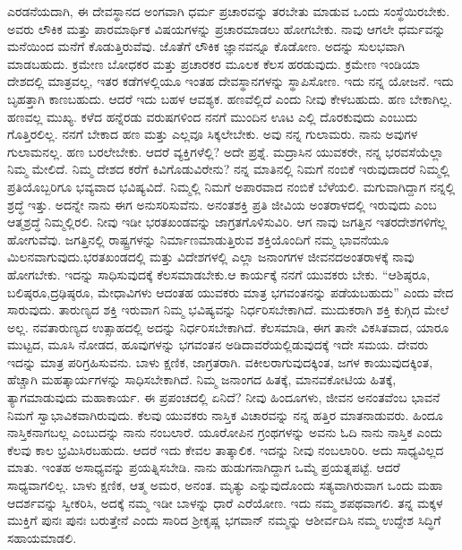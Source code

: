 \vskip -1pt

ಎರಡನೆಯದಾಗಿ, ಈ ದೇವಸ್ಥಾನದ ಅಂಗವಾಗಿ ಧರ್ಮ ಪ್ರಚಾರವನ್ನು ತರಬೇತು ಮಾಡುವ ಒಂದು ಸಂಸ್ಥೆಯಿರಬೇಕು. ಅವರು ಲೌಕಿಕ ಮತ್ತು ಪಾರಮಾರ್ಥಿಕ ವಿಷಯಗಳನ್ನು ಪ್ರಚಾರಮಾಡಲು ಹೋಗಬೇಕು. ನಾವು ಆಗಲೇ ಧರ್ಮವನ್ನು ಮನೆಯಿಂದ ಮನೆಗೆ ಕೊಡುತ್ತಿರುವೆವು. ಜೊತೆಗೆ ಲೌಕಿಕ ಜ್ಞಾನವನ್ನೂ ಕೊಡೋಣ. ಅದನ್ನು ಸುಲಭವಾಗಿ ಮಾಡಬಹುದು. ಕ್ರಮೇಣ ಬೋಧಕರ ಮತ್ತು ಪ್ರಚಾರಕರ ಮೂಲಕ ಕೆಲಸ ಹರಡುವುದು. ಕ್ರಮೇಣ ಇಂಡಿಯಾ ದೇಶದಲ್ಲಿ ಮಾತ್ರವಲ್ಲ, ಇತರ ಕಡೆಗಳಲ್ಲಿಯೂ ಇಂತಹ ದೇವಸ್ಥಾನಗಳನ್ನು ಸ್ಥಾಪಿಸೋಣ. ಇದು ನನ್ನ ಯೋಜನೆ. ಇದು ಬೃಹತ್ತಾಗಿ ಕಾಣಬಹುದು. ಆದರೆ ಇದು ಬಹಳ ಆವಶ್ಯಕ. ಹಣವೆಲ್ಲಿದೆ ಎಂದು ನೀವು ಕೇಳಬಹುದು. ಹಣ ಬೇಕಾಗಿಲ್ಲ. ಹಣವಲ್ಲ ಮುಖ್ಯ. ಕಳೆದ ಹನ್ನೆರಡು ವರುಷ\-ಗಳಿಂದ ನನಗೆ ಮುಂದಿನ ಊಟ ಎಲ್ಲಿ ದೊರಕುವುದು ಎಂಬುದು ಗೊತ್ತಿರಲಿಲ್ಲ. ನನಗೆ ಬೇಕಾದ ಹಣ ಮತ್ತು ಎಲ್ಲವೂ ಸಿಕ್ಕಲೇಬೇಕು. ಅವು ನನ್ನ ಗುಲಾಮರು. ನಾನು ಅವುಗಳ ಗುಲಾಮನಲ್ಲ. ಹಣ ಬರಲೇಬೇಕು. ಆದರೆ ವ್ಯಕ್ತಿಗಳೆಲ್ಲಿ? ಅದೇ ಪ್ರಶ್ನೆ. ಮದ್ರಾಸಿನ ಯುವಕರೇ, ನನ್ನ ಭರವಸೆಯೆಲ್ಲಾ ನಿಮ್ಮ ಮೇಲಿದೆ. ನಿಮ್ಮ ದೇಶದ ಕರೆಗೆ ಕಿವಿಗೊಡುವಿರೇನು? ನನ್ನ ಮಾತಿನಲ್ಲಿ ನಿಮಗೆ ನಂಬಿಕೆ ಇರುವುದಾದರೆ ನಿಮ್ಮಲ್ಲಿ ಪ್ರತಿಯೊಬ್ಬರಿಗೂ ಭವ್ಯವಾದ ಭವಿಷ್ಯವಿದೆ. ನಿಮ್ಮಲ್ಲಿ ನಿಮಗೆ ಅಪಾರವಾದ ನಂಬಿಕೆ ಬೆಳೆಯಲಿ. ಮಗುವಾಗಿದ್ದಾಗ ನನ್ನಲ್ಲಿ ಶ್ರದ್ಧೆ ಇತ್ತು. ಅದನ್ನೇ ನಾನು ಈಗ ಅನುಸರಿಸುವೆನು. ಅನಂತಶಕ್ತಿ ಪ್ರತಿ ಜೀವಿಯ ಅಂತರಾಳದಲ್ಲಿ ಇರುವುದು ಎಂಬ ಆತ್ಮಶ್ರದ್ಧೆ ನಿಮ್ಮಲ್ಲಿರಲಿ. ನೀವು ಇಡೀ ಭರತಖಂಡವನ್ನು ಜಾಗ್ರತಗೊಳಿಸುವಿರಿ. ಆಗ ನಾವು ಜಗತ್ತಿನ ಇತರ\break ದೇಶಗಳಿಗೆಲ್ಲ ಹೋಗುವೆವು. ಜಗತ್ತಿನಲ್ಲಿ ರಾಷ್ಟ್ರಗಳನ್ನು ನಿರ್ಮಾಣ\break ಮಾಡುತ್ತಿರುವ ಶಕ್ತಿಯೊಂದಿಗೆ ನಮ್ಮ ಭಾವನೆಯೂ ಮಿಲನವಾಗುವುದು.\break ಭರತಖಂಡದಲ್ಲಿ ಮತ್ತು ವಿದೇಶಗಳಲ್ಲಿ ಎಲ್ಲಾ ಜನಾಂಗಗಳ ಜೀವನದ\break ಅಂತರಾಳಕ್ಕೆ ನಾವು ಹೋಗಬೇಕು. ಇದನ್ನು ಸಾಧಿಸುವುದಕ್ಕೆ ಕೆಲಸಮಾಡಬೇಕು.\break ಆ ಕಾರ್ಯಕ್ಕೆ ನನಗೆ ಯುವಕರು ಬೇಕು. “ಆಶಿಷ್ಠರೂ, ಬಲಿಷ್ಠರೂ,\break ದ್ರಢಿಷ್ಠರೂ, ಮೇಧಾವಿಗಳು ಆದಂತಹ ಯುವಕರು ಮಾತ್ರ ಭಗವಂತನನ್ನು ಪಡೆಯಬಹುದು” ಎಂದು ವೇದ ಸಾರುವುದು. ತಾರುಣ್ಯದ ಶಕ್ತಿ ಇರುವಾಗ ನಿಮ್ಮ ಭವಿಷ್ಯವನ್ನು ನಿರ್ಧರಿಸಬೇಕಾಗಿದೆ. ಮುದುಕರಾಗಿ ಶಕ್ತಿ ಕುಗ್ಗಿದ ಮೇಲೆ ಅಲ್ಲ. ನವತಾರುಣ್ಯದ ಉತ್ಸಾಹದಲ್ಲಿ ಅದನ್ನು ನಿರ್ಧರಿಸಬೇಕಾಗಿದೆ. ಕೆಲಸಮಾಡಿ, ಈಗ ತಾನೇ ವಿಕಸಿತವಾದ, ಯಾರೂ ಮುಟ್ಟದ, ಮೂಸಿ ನೋಡದ, ಹೂವುಗಳನ್ನು ಭಗವಂತನ ಅಡಿದಾವರೆಯಲ್ಲಿಡುವುದಕ್ಕೆ ಇದೇ ಸಮಯ. ದೇವರು ಇದನ್ನು ಮಾತ್ರ ಪರಿಗ್ರಹಿಸುವನು. ಬಾಳು ಕ್ಷಣಿಕ, ಜಾಗ್ರತರಾಗಿ. ವಕೀಲರಾಗುವುದಕ್ಕಿಂತ, ಜಗಳ ಕಾಯುವುದಕ್ಕಿಂತ, ಹೆಚ್ಚಾಗಿ ಮಹತ್ಕಾರ್ಯಗಳನ್ನು ಸಾಧಿಸಬೇಕಾಗಿದೆ. ನಿಮ್ಮ ಜನಾಂಗದ ಹಿತಕ್ಕೆ, ಮಾನವಕೋಟಿಯ ಹಿತಕ್ಕೆ, ತ್ಯಾಗಮಾಡುವುದು ಮಹಾಕಾರ್ಯ. ಈ ಪ್ರಪಂಚದಲ್ಲಿ ಏನಿದೆ? ನೀವು ಹಿಂದೂಗಳು, ಜೀವನ ಅನಂತವೆಂಬ ಭಾವನೆ ನಿಮಗೆ ಸ್ವಾಭಾವಿಕವಾಗಿರುವುದು. ಕೆಲವು ಯುವಕರು ನಾಸ್ತಿಕ ವಿಚಾರವನ್ನು ನನ್ನ ಹತ್ತಿರ ಮಾತನಾಡುವರು. ಹಿಂದೂ ನಾಸ್ತಿಕನಾಗಬಲ್ಲ ಎಂಬುದನ್ನು ನಾನು ನಂಬಲಾರೆ. ಯೂರೋಪಿನ ಗ್ರಂಥಗಳನ್ನು ಅವನು ಓದಿ ನಾನು ನಾಸ್ತಿಕ ಎಂದು ಕೆಲವು ಕಾಲ ಭ್ರಮಿಸಿರಬಹುದು. ಆದರೆ ಇದು ಕೇವಲ ತಾತ್ಕಾಲಿಕ. ಇದನ್ನು ನೀವು ನಂಬಲಾರಿರಿ. ಅದು ಸಾಧ್ಯವಿಲ್ಲದ ಮಾತು. ಇಂತಹ ಅಸಾಧ್ಯವನ್ನು ಪ್ರಯತ್ನಿಸಬೇಡಿ. ನಾನು ಹುಡುಗನಾಗಿದ್ದಾಗ ಒಮ್ಮೆ ಪ್ರಯತ್ನಪಟ್ಟೆ. ಆದರೆ ಸಾಧ್ಯವಾಗಲಿಲ್ಲ. ಬಾಳು ಕ್ಷಣಿಕ, ಆತ್ಮ ಅಮರ, ಅನಂತ. ಮೃತ್ಯು ಎನ್ನುವುದೊಂದು ಸತ್ಯವಾಗಿರುವಾಗ ಒಂದು ಮಹಾ ಆದರ್ಶವನ್ನು ಸ್ವೀಕರಿಸಿ, ಅದಕ್ಕೆ ನಮ್ಮ ಇಡೀ ಬಾಳನ್ನು ಧಾರೆ ಎರೆಯೋಣ. ಇದು ನಮ್ಮ ಶಪಥವಾಗಲಿ. ತನ್ನ ಮಕ್ಕಳ ಮುಕ್ತಿಗೆ ಪುನಃ ಪುನಃ ಬರುತ್ತೇನೆ ಎಂದು ಸಾರಿದ ಶ‍್ರೀಕೃಷ್ಣ ಭಗವಾನ್​ ನಮ್ಮನ್ನು ಆಶೀರ್ವದಿಸಿ ನಮ್ಮ ಉದ್ದೇಶ ಸಿದ್ಧಿಗೆ ಸಹಾಯಮಾಡಲಿ.

